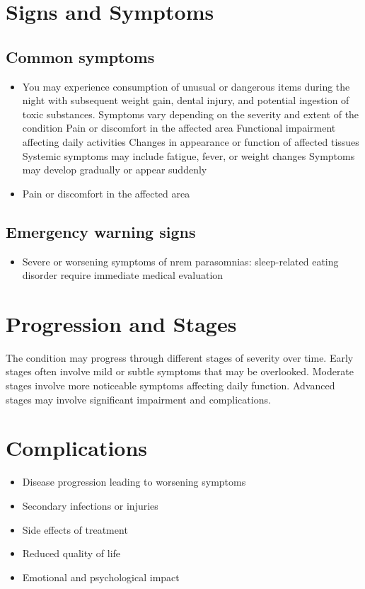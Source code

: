 \section{Signs and Symptoms}

\subsection{Common symptoms}
\begin{itemize}[noitemsep]
  \item You may experience consumption of unusual or dangerous items during the night with subsequent weight gain, dental injury, and potential ingestion of toxic substances. Symptoms vary depending on the severity and extent of the condition Pain or discomfort in the affected area Functional impairment affecting daily activities Changes in appearance or function of affected tissues Systemic symptoms may include fatigue, fever, or weight changes Symptoms may develop gradually or appear suddenly
  \item Pain or discomfort in the affected area
  \end{itemize}

\subsection{Emergency warning signs}
\begin{itemize}[noitemsep]
  \item Severe or worsening symptoms of nrem parasomnias: sleep-related eating disorder require immediate medical evaluation
\end{itemize}
\section{Progression and Stages}
The condition may progress through different stages of severity over time. Early stages often involve mild or subtle symptoms that may be overlooked. Moderate stages involve more noticeable symptoms affecting daily function. Advanced stages may involve significant impairment and complications.
\section{Complications}
\begin{itemize}[noitemsep]
  \item Disease progression leading to worsening symptoms
  \item Secondary infections or injuries
  \item Side effects of treatment
  \item Reduced quality of life
  \item Emotional and psychological impact
\end{itemize}
